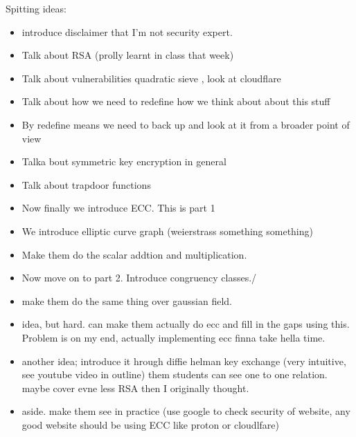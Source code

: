 \documentclass{article}
\begin{document}
Spitting ideas:

\begin{itemize}
    \item introduce disclaimer that I'm not security expert.
    \item Talk about RSA (prolly learnt in class that week)
    \item Talk about vulnerabilities quadratic sieve , look at cloudflare
    
    \item Talk about how we need to redefine how we think about about this stuff
    \item By redefine means we need to back up and look at it from a broader point of view
    \item Talka bout symmetric key encryption in general
    \item Talk about trapdoor functions


    \item Now finally we introduce ECC. This is part 1
    \item We introduce elliptic curve graph (weierstrass something something)
    \item Make them do the scalar addtion and multiplication.

    \item Now move on to part 2. Introduce congruency classes./
    \item make them do the same thing over gaussian field.

    \item idea, but hard. can make them actually do ecc and fill in the gaps using this. Problem is on my end, actually implementing ecc finna take hella time.
    \item another idea; introduce it hrough diffie helman key exchange (very intuitive, see youtube video in outline) them students can see one to one relation. maybe cover evne less RSA then I originally thought.

    \item aside. make them see in practice (use google to check security of website, any good website should be using ECC like proton or cloudlfare)
\end{itemize}

    
\end{document}
